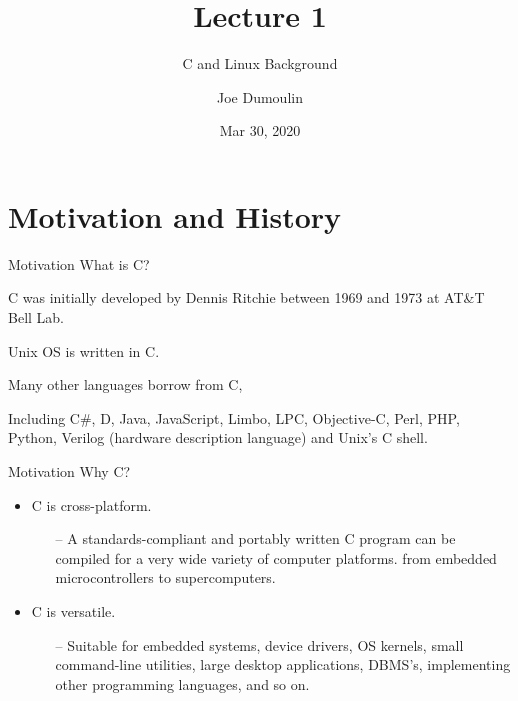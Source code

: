 \documentclass[10pt]{beamer}
\title{Lecture 1}
\subtitle{C and Linux Background}
\date{Mar 30, 2020}
\author{Joe Dumoulin}
\institute{Eastern Washington University}
\begin{document}
\maketitle
\section{Motivation and History} 



\begin{frame}[fragile]{Motivation}
What is C?

C was initially developed by Dennis Ritchie between 1969 and 1973 at AT\&T Bell Lab.

Unix OS is written in C.

Many other languages borrow from C,

Including C\#, D, Java, JavaScript, Limbo, LPC, Objective-C, Perl, PHP, Python, Verilog (hardware description language) and Unix's C shell. 

    
\end{frame}
\begin{frame}[fragile]{Motivation}
Why C?
\begin{itemize}
	\item C is cross-platform.
	\begin{itemize}
		\item[--] A standards-compliant and portably written C program can be compiled for a very wide variety of computer platforms.
from embedded microcontrollers to supercomputers.
	\end{itemize}
	\item C is versatile. 
	\begin{itemize}
		\item[--] Suitable for embedded systems, device drivers, OS kernels, small command-line utilities, large desktop applications, DBMS's, implementing other programming languages, and so on.
	\end{itemize}

\end{itemize}
\end{frame}
\end{document}
